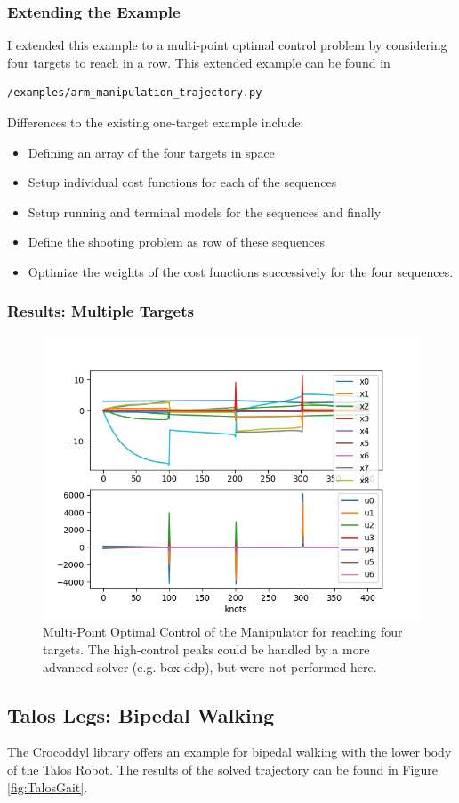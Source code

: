 \subsubsection{Extending the Example}
I extended this example to a multi-point optimal control problem by considering four targets to reach in a row. This extended example can be found in 
\begin{verbatim}
/examples/arm_manipulation_trajectory.py
\end{verbatim}
Differences to the existing one-target example include:
\begin{itemize}
\item Defining an array of the four targets in space
\item Setup individual cost functions for each of the sequences
\item Setup running and terminal models for the sequences and finally
\item Define the shooting problem as row of these sequences 
\item Optimize the weights of the cost functions successively for the four sequences.
\end{itemize}
\subsubsection{Results: Multiple Targets}
\begin{figure}[h!]
\centering
\includegraphics[width=.5\linewidth]{Media/Crocoddyl/ExArm/ArmSolution.png}
\caption{Multi-Point Optimal Control of the Manipulator for reaching four targets. The high-control peaks could be handled by a more advanced solver (e.g. box-ddp), but were not performed here.}
\end{figure}

\subsection{Talos Legs: Bipedal Walking}
The Crocoddyl library offers an example for bipedal walking with the lower body of the Talos \cite{stasse2017talos} Robot. The results of the solved trajectory can be found in Figure \ref{fig:TalosGait}. 

